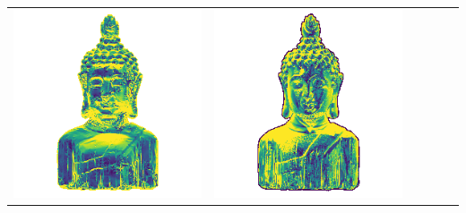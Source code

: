 \begin{center}
\begin{tabularx}{\linewidth}{@{}Y@{}Y@{}Y@{}Y@{}Y@{}Y@{}}
\includegraphics[width=\linewidth]{semisynthetic/20160617_16_yu_err.png} &
\includegraphics[width=\linewidth]{semisynthetic/20160617_16_dpsn_err.png} &

\end{tabularx}
\end{center}
